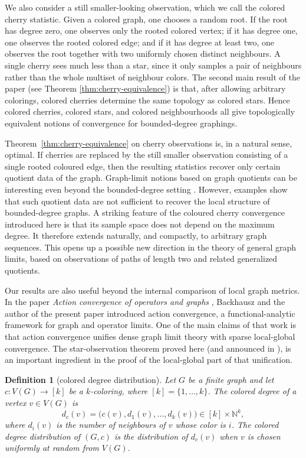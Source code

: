 \documentclass[11pt]{amsart}
\newcommand{\N}{\mathbb N}
\newtheorem{definition}[theorem]{Definition}
\theoremstyle{remark}
\begin{document}
We also consider a still smaller-looking observation, which we call the colored cherry statistic. Given a colored graph, one chooses a random root. If the root has degree zero, one observes only the rooted colored vertex; if it has degree one, one observes the rooted colored edge; and if it has degree at least two, one observes the root together with two uniformly chosen distinct neighbours. A single cherry sees much less than a star, since it only samples a pair of neighbours rather than the whole multiset of neighbour colors. The second main result of the paper (see Theorem \ref{thm:cherry-equivalence}) is that, after allowing arbitrary colorings, colored cherries determine the same topology as colored stars. Hence colored cherries, colored stars, and colored neighbourhoods all give topologically equivalent notions of convergence for bounded-degree graphings. 

Theorem~\ref{thm:cherry-equivalence} on cherry observations is, in a natural sense, optimal. If cherries are replaced by the still smaller observation consisting of a single rooted coloured edge, then the resulting statistics recover only certain quotient data of the graph. Graph-limit notions based on graph quotients can be interesting even beyond the bounded-degree setting \cite{KKLS}. However, examples show that such quotient data are not sufficient to recover the local structure of bounded-degree graphs. A striking feature of the coloured cherry convergence introduced here is that its sample space does not depend on the maximum degree. It therefore extends naturally, and compactly, to arbitrary graph sequences. This opens up a possible new direction in the theory of general graph limits, based on observations of paths of length two and related generalized quotients.

Our results are also useful beyond the internal comparison of local graph metrics. In the paper \emph{Action convergence of operators and graphs} \cite{BSzAction}, Backhausz and the author of the present paper introduced action convergence, a functional-analytic framework for graph and operator limits. One of the main claims of that work is that action convergence unifies dense graph limit theory with sparse local-global convergence. The star-observation theorem proved here (and announced in \cite{BSzAction}), is an important ingredient in the proof of the local-global part of that unification. 

\begin{definition}[colored degree distribution]
Let $G$ be a finite graph and let $c\colon V(G)\to [k]$ be a $k$-coloring, where $[k]=\{1,\ldots,k\}$.  The \emph{colored degree} of a vertex $v\in V(G)$ is
\[
 d_c(v)=\bigl(c(v),d_1(v),\ldots,d_k(v)\bigr)\in [k]\times\N^k,
\]
where $d_i(v)$ is the number of neighbours of $v$ whose color is $i$.  The \emph{colored degree distribution} of $(G,c)$ is the distribution of $d_c(v)$ when $v$ is chosen uniformly at random from $V(G)$.
\end{definition}
\end{document}
